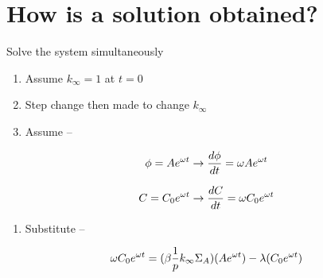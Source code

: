 \documentclass[aspectratio=1610,pdftex,dvipsnames,compress,xcolor={dvipsnames}]{beamer}
\begin{document}
\section{How is a solution obtained?}


\addtocounter{framenumber}{-1} 
\begin{frame}{Solve the system simultaneously}
    \begin{enumerate}[series=outerlist,topsep=0pt,itemsep=21pt,leftmargin=*,label=(\arabic*)]
        \item[]Assume $k_\infty = 1$ at $t = 0$
        \item[]Step change then made to change $k_\infty$
        \item[]Assume --
    \end{enumerate}

    \vspace*{\fill}

    \begin{equation}
        \LARGE
        \phi = A e^{\omega t} \rightarrow \frac{d\phi}{dt} = \omega A e^{\omega t}
    \end{equation}

    \begin{equation}
        \LARGE
        C = C_0 e^{\omega t} \rightarrow \frac{dC}{dt} = \omega C_0 e^{\omega t}
    \end{equation}

    \vspace*{\fill}

    \begin{enumerate}[series=outerlist,topsep=0pt,itemsep=21pt,leftmargin=*,label=(\arabic*)]
        \item[]Substitute --
    \end{enumerate}

    \vspace*{\fill}

    \begin{equation}
        \LARGE
        \omega C_0 e^{\omega t}=(\beta \frac{1}{p} k_\infty \Sigma_A)(A e^{\omega t})-\lambda (C_0 e^{\omega t})
    \end{equation}
\end{frame}
\end{document}

